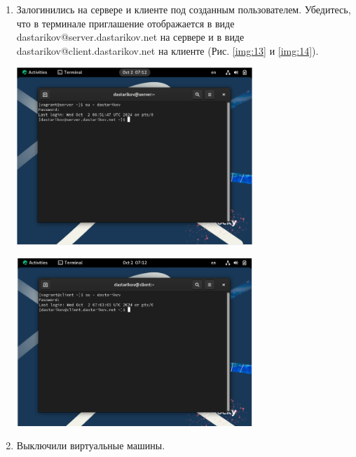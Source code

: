\begin{enumerate}
    \item Залогинились на сервере и клиенте под созданным пользователем. Убедитесь, что в терминале приглашение отображается в виде dastarikov@server.dastarikov.net на сервере и в виде dastarikov@client.dastarikov.net на клиенте (Рис. \ref{img:13} и \ref{img:14}).
    \begin{center}
        \centering
        \includegraphics[width=0.7\textwidth]{../images/img13.png}
        \label{img:13}
    \end{center}
    \begin{center}
        \centering
        \includegraphics[width=0.7\textwidth]{../images/img14.png}
        \label{img:14}
    \end{center}

    \item Выключили виртуальные машины.
\end{enumerate}

